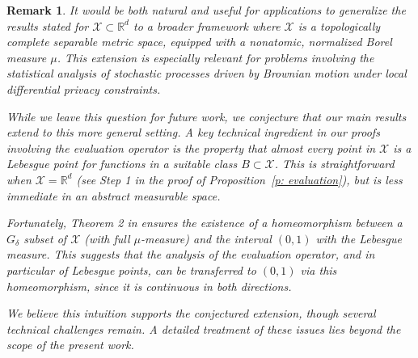 \documentclass[a4paper, 11pt]{article}
\newtheorem{prop}{Proposition}
\newtheorem{rem}{Remark}
\theoremstyle{definition}
\newcommand{\R}{{\mathbb{R}}}
\begin{document}
{%

\begin{rem}{\label{rk: extension functional space}}
It would be both natural and useful for applications to generalize the results stated for $\mathcal{X} \subset \mathbb{R}^d$ to a broader framework where $\mathcal{X}$ is a topologically complete separable metric space, equipped with a nonatomic, normalized Borel measure $\mu$. This extension is especially relevant for problems involving the statistical analysis of stochastic processes driven by Brownian motion under local differential privacy constraints.

While we leave this question for future work, we conjecture that our main results extend to this more general setting. A key technical ingredient in our proofs involving the evaluation operator is the property that almost every point in $\mathcal{X}$ is a Lebesgue point for functions in a suitable class $B \subset \mathcal{X}$. This is straightforward when $\mathcal{X} = \mathbb{R}^d$ (see Step 1 in the proof of Proposition~\ref{p: evaluation}), but is less immediate in an abstract measurable space.

Fortunately, Theorem 2 in \cite{Oxt} ensures the existence of a homeomorphism between a $G_\delta$ subset of $\mathcal{X}$ (with full $\mu$-measure) and the interval $(0,1)$ with the Lebesgue measure. This suggests that the analysis of the evaluation operator, and in particular of Lebesgue points, can be transferred to $(0,1)$ via this homeomorphism, since it is continuous in both directions. 

We believe this intuition supports the conjectured extension, though several technical challenges remain. A detailed treatment of these issues lies beyond the scope of the present work. %

\end{rem}









}
\end{document}
